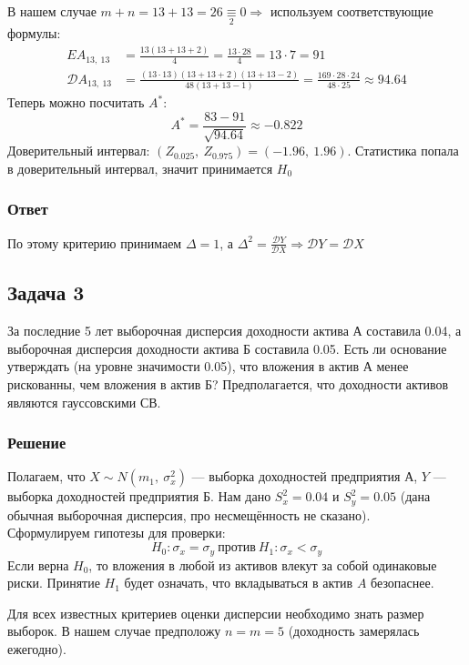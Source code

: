 \documentclass[12pt, a4paper]{article}
\newcommand{\dev}{\mathcal{D}}
\begin{document}
В нашем случае $m + n = 13 + 13 = 26 \underset{2}{\equiv} 0 \Rightarrow $ используем соответствующие формулы:
\begin{equation*}
    \begin{aligned}
        EA_{13,\ 13} &= \frac{13(13 + 13 + 2)}{4} = \frac{13\cdot 28}{4} = 13\cdot 7 = 91\\
        \dev A_{13,\ 13} &= \frac{(13\cdot 13)(13 + 13 + 2)(13 + 13 - 2)}{48(13 + 13 - 1)} = \frac{169\cdot 28 \cdot 24}{48\cdot 25} \approx 94.64
    \end{aligned}
\end{equation*}
Теперь можно посчитать $A^*$:
\[A^* = \frac{83 - 91}{\sqrt{94.64}} \approx -0.822\]
Доверительный интервал: $(Z_{0.025},\ Z_{0.975}) = (-1.96,\ 1.96)$. Статистика попала в доверительный интервал, значит принимается $H_0$
\subsubsection*{Ответ}
По этому критерию принимаем $\Delta = 1$, а $\Delta^2 = \frac{\dev Y}{\dev X}\Rightarrow \dev Y = \dev X$
\subsection*{Задача 3}
За последние 5 лет выборочная дисперсия доходности актива А составила 0.04, а выборочная дисперсия доходности актива Б составила 0.05. Есть ли основание утверждать (на уровне значимости 0.05), что вложения в актив А менее рискованны, чем вложения в актив Б? Предполагается, что доходности активов являются гауссовскими СВ.
\subsubsection*{Решение}
Полагаем, что $X \sim N(m_1,\ \sigma_x^2)$ --- выборка доходностей предприятия А, $Y$ --- выборка доходностей предприятия Б. Нам дано $S_x^2 = 0.04$ и $S_y^2 = 0.05$ (дана обычная выборочная дисперсия, про несмещённость не сказано).\\
Сформулируем гипотезы для проверки:
\[H_0: \sigma_x = \sigma_y\ \text{против}\ H_1: \sigma_x < \sigma_y\]
Если верна $H_0$, то вложения в любой из активов влекут за собой одинаковые риски. Принятие $H_1$ будет означать, что вкладываться в актив $A$ безопаснее.

Для всех известных критериев оценки дисперсии необходимо знать размер выборок. В нашем случае предположу $n = m = 5$ (доходность замерялась ежегодно).
\end{document}
